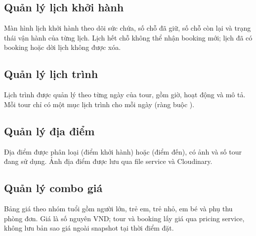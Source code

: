 

\subsection{Quản lý lịch khởi hành}

Màn hình lịch khởi hành theo dõi sức chứa, số chỗ đã giữ, số chỗ còn lại và trạng thái vận hành của từng lịch. Lịch hết chỗ không thể nhận booking mới; lịch đã có booking hoặc dời lịch không được xóa.


\subsection{Quản lý lịch trình}

Lịch trình được quản lý theo từng ngày của tour, gồm giờ, hoạt động và mô tả. Mỗi tour chỉ có một mục lịch trình cho mỗi ngày (ràng buộc ).


\subsection{Quản lý địa điểm}

Địa điểm được phân loại  (điểm khởi hành) hoặc  (điểm đến), có ảnh và số tour đang sử dụng. Ảnh địa điểm được lưu qua file service và Cloudinary.


\subsection{Quản lý combo giá}

Bảng giá theo nhóm tuổi gồm người lớn, trẻ em, trẻ nhỏ, em bé và phụ thu phòng đơn. Giá là số nguyên VND; tour và booking lấy giá qua pricing service, không lưu bản sao giá ngoài snapshot tại thời điểm đặt.


